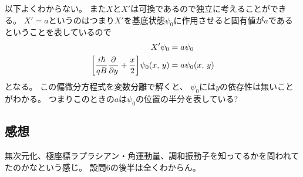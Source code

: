 \documentclass[../../sp_2013.tex]{subfiles}
\begin{document}
以下よくわからない。
また\(X\)と\(X'\)は可換であるので独立に考えることができる。
\(X'=a\)というのはつまり\(X'\)を基底状態\(\psi_0\)に作用させると固有値が\(a\)であるということを表しているので
\begin{equation}\begin{aligned}[b]
    X'\psi_0 &= a \psi_0\\
    \qty[\frac{i\hbar}{qB}\pdv{y}+\frac{x}{2}]\psi_0(x,\,y) &= a\psi_0(x,\,y)
\end{aligned}\end{equation}
となる。
この偏微分方程式を変数分離で解くと、
\(\psi_0\)には\(y\)の依存性は無いことがわかる。
つまりこのときの\(a\)は\(\psi_0\)の位置の半分を表している?

\subsection*{感想}
無次元化、極座標ラプラシアン・角運動量、調和振動子を知ってるかを問われてたのかなという感じ。
設問6の後半は全くわからん。
\end{document}
